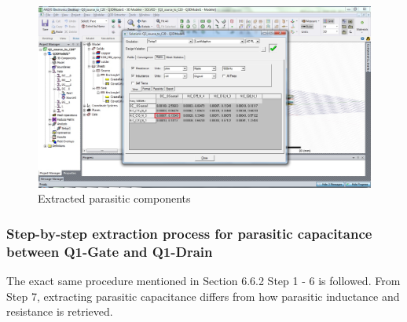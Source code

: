 \begin{figure} [H]
  \centering
  \includegraphics[width=\linewidth]{pictures/examples/Q3S_C16_extractions.png}
  \caption{Extracted parasitic components}
  \label{fig:C11_C20_extractions}
\end{figure}

\subsubsection{Step-by-step extraction process for parasitic capacitance between Q1-Gate and Q1-Drain}

The exact same procedure mentioned in Section 6.6.2 Step 1 - 6 is followed. From Step 7, extracting parasitic capacitance differs from how parasitic inductance and resistance is retrieved.

